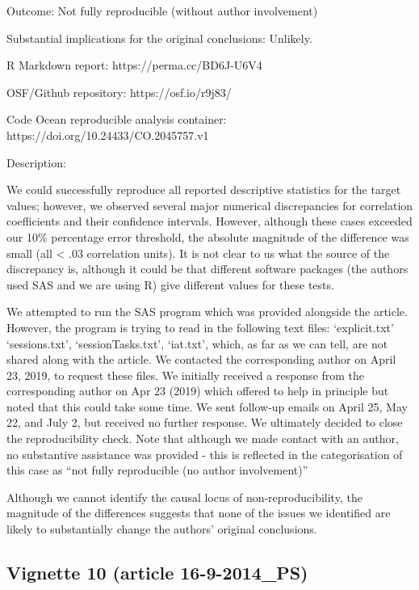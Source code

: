 \begin{appendix}
Outcome: Not fully reproducible (without author involvement)

Substantial implications for the original conclusions: Unlikely.

R Markdown report: https://perma.cc/BD6J-U6V4

OSF/Github repository: https://osf.io/r9j83/

Code Ocean reproducible analysis container:
https://doi.org/10.24433/CO.2045757.v1

Description:

We could successfully reproduce all reported descriptive statistics for
the target values; however, we observed several major numerical
discrepancies for correlation coefficients and their confidence
intervals. However, although these cases exceeded our 10\% percentage
error threshold, the absolute magnitude of the difference was small (all
\textless{} .03 correlation units). It is not clear to us what the
source of the discrepancy is, although it could be that different
software packages (the authors used SAS and we are using R) give
different values for these tests.

We attempted to run the SAS program which was provided alongside the
article. However, the program is trying to read in the following text
files: `explicit.txt' `sessions.txt', `sessionTasks.txt', `iat.txt',
which, as far as we can tell, are not shared along with the article. We
contacted the corresponding author on April 23, 2019, to request these
files. We initially received a response from the corresponding author on
Apr 23 (2019) which offered to help in principle but noted that this
could take some time. We sent follow-up emails on April 25, May 22, and
July 2, but received no further response. We ultimately decided to close
the reproducibility check. Note that although we made contact with an
author, no substantive assistance was provided - this is reflected in
the categorisation of this case as ``not fully reproducible (no author
involvement)''

Although we cannot identify the causal locus of non-reproducibility, the
magnitude of the differences suggests that none of the issues we
identified are likely to substantially change the authors' original
conclusions.

\hypertarget{vignette-10-article-16-9-2014_ps}{%
\subsection{Vignette 10 (article
16-9-2014\_PS)}\label{vignette-10-article-16-9-2014_ps}}


\end{appendix}
